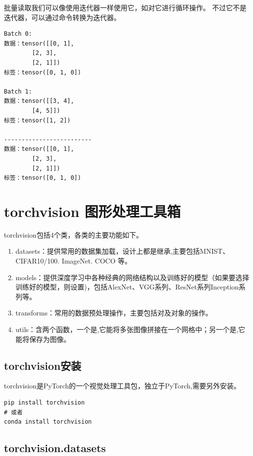 批量读取我们可以像使用迭代器一样使用它，如对它进行循环操作。
不过它不是迭代器，可以通过命令转换为迭代器。

\begin{lstlisting}[style=demostyle,numbers=none] 
Batch 0:
数据：tensor([[0, 1],
        [2, 3],
        [2, 1]])
标签：tensor([0, 1, 0])

Batch 1:
数据：tensor([[3, 4],
        [4, 5]])
标签：tensor([1, 2])

-------------------------
数据：tensor([[0, 1],
        [2, 3],
        [2, 1]])
标签：tensor([0, 1, 0])
\end{lstlisting}

    
    

\section{torchvision 图形处理工具箱}
\label{sec:pytorch_torchvision}
torchvision包括4个类，各类的主要功能如下。
\begin{enumerate}[label=\arabic*)]
    \item datasets：提供常用的数据集加载，设计上都是继承,主要包括MNIST、CIFAR10/100. ImageNet. COCO 等。
    \item models：提供深度学习中各种经典的网络结构以及训练好的模型（如果要选择训练好的模型，则设置)，包括AlexNet、VGG系列、ResNet系列Inception系列等。
    \item transforms：常用的数据预处理操作，主要包括对及对象的操作。
    \item utils：含两个函数，一个是,它能将多张图像拼接在一个网格中；另一个是,它能将保存为图像。
\end{enumerate}

\subsection{torchvision安装}
\label{subsec:pytorch_torchvision安装}
torchvision是PyTorch的一个视觉处理工具包，独立于PyTorch,需要另外安装。
\begin{lstlisting}[style=demostyle,numbers=none] 
pip install torchvision
# 或者
conda install torchvision
\end{lstlisting}

\subsection{torchvision.datasets}
\label{subsec:pytorch_torchvision.datasets}

